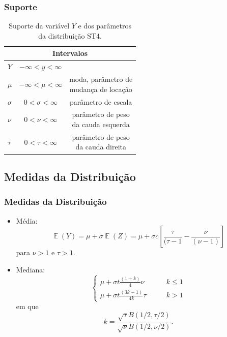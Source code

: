 \documentclass[13pt, aspectratio=169]{beamer}
\DeclareMathOperator{\EX}{\mathbb{E}}%
\begin{document}
\begin{frame}
    \frametitle{Suporte}
    
    \begingroup
    \setlength{\tabcolsep}{12pt}
    \renewcommand{\arraystretch}{1.9}

    \begin{table}[!ht]
        \centering    
        \begin{tabular}{l c c}
            \multicolumn{3}{c}{Intervalos} \\
            \hline
            $Y$ & $- \infty < y < \infty$ &\\
            $\mu$ & $- \infty < \mu < \infty$ & \makecell{\scriptsize moda, parâmetro de \\ \scriptsize mudança de locação}\\
            $\sigma$ & $0 < \sigma < \infty$ & \scriptsize parâmetro de escala\\
            $\nu$ & $0 < \nu < \infty$ & \makecell{\scriptsize parâmetro de peso \\ \scriptsize da cauda esquerda} \\
            $\tau$ & $0 < \tau < \infty$ & \makecell{\scriptsize parâmetro de peso \\ \scriptsize da cauda direita} \\
        \hline
        \end{tabular}
        \caption{Suporte da variável $Y$ e dos parâmetros da distribuição ST4.}    
    \end{table}

    \endgroup
\end{frame}

\subsection{Medidas da Distribuição}
\begin{frame}
    \frametitle{Medidas da Distribuição}
    \begin{itemize}
        \item Média:
            \begin{equation*}
                \EX(Y) = \mu + \sigma \EX(Z) = \mu + \sigma c \left[ \frac{\tau}{(\tau - 1} - \frac{\nu}{(\nu - 1)} \right]
            \end{equation*}
            para $\nu > 1$ e $\tau > 1$.
        \pause
        \item Mediana: 
            \begin{equation*}
                \begin{cases}
                    \mu + \sigma t \frac{(1 + k)}{4}\nu \qquad &k \leq 1 \\
                    \mu + \sigma t \frac{(3k - 1)}{4k} \tau \qquad &k > 1
                \end{cases}
            \end{equation*}
        \pause
            em que
            \begin{equation*}
                k = \frac{\sqrt{\tau} B(1/2, \tau/2)}{\sqrt{\nu} B(1/2, \nu/2)}.
            \end{equation*}
    \end{itemize}
\end{frame}
\end{document}

